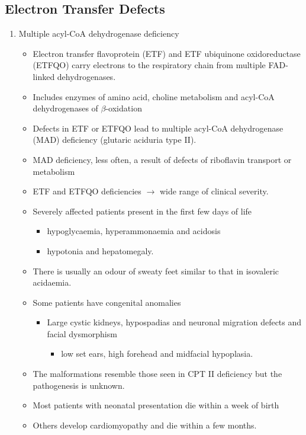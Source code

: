 \documentclass{scrartcl}
\begin{document}
\subsection{Electron Transfer Defects}
\label{sec:orgfe0f496}
\begin{enumerate}
\item Multiple acyl-CoA dehydrogenase deficiency
\label{sec:org8de6a49}
\begin{itemize}
\item Electron transfer flavoprotein (ETF) and ETF ubiquinone
oxidoreductase (ETFQO) carry electrons to the respiratory chain from
multiple FAD-linked dehydrogenases.
\item Includes enzymes of amino acid, choline metabolism and acyl-CoA
dehydrogenases of \(\beta\)-oxidation
\item Defects in ETF or ETFQO lead to multiple acyl-CoA dehydrogenase
(MAD) deficiency (glutaric aciduria type II).
\item MAD deficiency, less often, a result of defects of riboflavin
transport or metabolism
\item ETF and ETFQO deficiencies \(\to\) wide range of clinical severity.
\item Severely affected patients present in the first few days of life
\begin{itemize}
\item hypoglycaemia, hyperammonaemia and acidosis
\item hypotonia and hepatomegaly.
\end{itemize}
\item There is usually an odour of sweaty feet similar to that in isovaleric acidaemia.
\item Some patients have congenital anomalies
\begin{itemize}
\item Large cystic kidneys, hypospadias and neuronal migration defects and facial dysmorphism
\begin{itemize}
\item low set ears, high forehead and midfacial hypoplasia.
\end{itemize}
\end{itemize}
\item The malformations resemble those seen in CPT II deficiency but the pathogenesis is unknown.
\item Most patients with neonatal presentation die within a week of birth
\item Others develop cardiomyopathy and die within a few months.

\end{itemize}
\end{enumerate}
\end{document}
